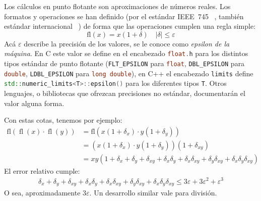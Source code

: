   Los cálculos en punto flotante son aproximaciones de números reales.
  Los formatos y operaciones se han definido
  (por el estándar IEEE~745~%
    \cite{IEEE19:_754_floating_point},
   también estándar internacional~%
    \cite{ISO11:_floating_point})
   de forma que las operaciones cumplen una regla simple:
   \begin{equation}
     \label{eq:fp-def}
     \mathrm{fl}(x)
       = x (1 + \delta)
       \quad  \lvert \delta \rvert \le \varepsilon
   \end{equation}
   Acá \(\varepsilon\) describe la precisión de los valores,
   se le conoce como \emph{epsilon de la máquina}.
   En C este valor se define en el encabezado
   \lstinline[language = C]!float.h!
   para los distintos tipos estándar de punto flotante
   (\lstinline[language = C]!FLT_EPSILON! para \lstinline[language = C]!float!,
    \lstinline[language = C]!DBL_EPSILON!
      para \lstinline[language = C]!double!,
    \lstinline[language = C]!LDBL_EPSILON!
     para \lstinline[language = C]!long double!),
   en C++ el encabezado \lstinline[language = C++]!limits!
   define \lstinline[language = C++]!std::numeric_limits<T>::epsilon()!
   para los diferentes tipos \lstinline[language = C++]!T!.
   Otros lenguajes,
   o bibliotecas que ofrezcan precisiones no estándar,
   documentarán el valor alguna forma.

   Con estas cotas,
   tenemos por ejemplo:
   \begin{align*}
     \mathrm{fl}(\operatorname{fl}(x) \cdot \operatorname{fl}(y))
       &= \mathrm{fl}(x (1 + \delta_x) \cdot y (1 + \delta_y)) \\
       &= (x (1 + \delta_x) \cdot y (1 + \delta_y)) (1 + \delta_{x y}) \\
       &= x y
           (1 + \delta_x + \delta_y + \delta_{x y}
              + \delta_x \delta_y
                  + \delta_x \delta_{x y}
                  + \delta_y \delta_{x y}
              + \delta_x \delta_y \delta_{x y})
   \end{align*}
   El error relativo cumple:
   \begin{align*}
     \delta_x + \delta_y + \delta_{x y}
        + \delta_x \delta_y
            + \delta_x \delta_{x y}
            + \delta_y \delta_{x y}
        + \delta_x \delta_y \delta_{x y}
        \le 3 \varepsilon + 3 \varepsilon^2 + \varepsilon^3
   \end{align*}
   O sea,
   aproximadamente \(3 \varepsilon\).
   Un desarrollo similar vale para división.

